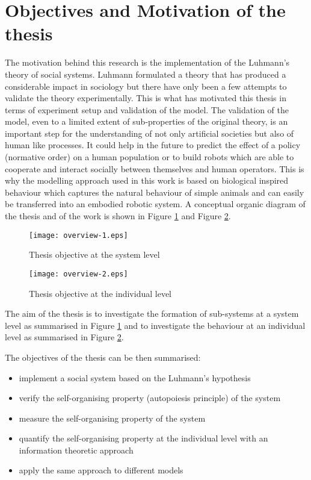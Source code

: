 \section{Objectives and Motivation of the thesis}
The motivation behind this research is the implementation of the Luhmann's
theory of social systems.
Luhmann formulated a theory that has produced a considerable
impact in sociology but there have only been a few attempts to validate
the theory experimentally.
This is what has motivated this thesis in terms of experiment setup and
validation of the model.
The validation of the model, even to a limited extent of sub-properties of the
original theory, is an important step for the understanding of not only
artificial societies but also of human like processes.
It could help in the future to predict the effect of a policy (normative order)
on a human population or to build robots which are able to cooperate and
interact socially between themselves and human operators.
This is why the modelling approach used in this work is based on biological
inspired behaviour which captures the natural behaviour of simple animals and
can easily be transferred into an embodied robotic system.
A conceptual organic diagram of the thesis and of the work is shown in 
Figure \ref{fig:overview-1} and Figure \ref{fig:overview-2}.

\begin{figure}[htbp]
\begin{center}
\texttt{[image: overview-1.eps]}
\end{center}
\small{
\caption[Thesis research aim system]{Thesis objective at the system level \label{fig:overview-1}}}
\end{figure}

\begin{figure}[htbp]
\begin{center}
\texttt{[image: overview-2.eps]}
\end{center}
\small{
\caption[Thesis research aim individual]{Thesis objective at the individual level \label{fig:overview-2}}}
\end{figure}
The aim of the thesis is to investigate the formation of sub-systems at a
system level as summarised in Figure \ref{fig:overview-1} and to
investigate the behaviour at an individual level as summarised in Figure \ref{fig:overview-2}.

The objectives of the thesis can be then summarised:
\begin{itemize}
\item implement a social system based on the Luhmann's hypothesis
\item verify the self-organising property (autopoiesis principle) of the system
\item measure the self-organising property of the system
\item quantify the self-organising property at the individual level with an
information theoretic approach
\item apply the same approach to different models
\end{itemize}

